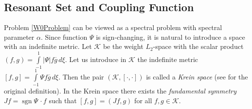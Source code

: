 \documentclass[11pt,english]{amsart}
\begin{document}
\subsection{Resonant Set and Coupling Function}
Problem \eqref{W0Problem} can be viewed as a spectral problem with  spectral parameter $\alpha$.
Since function $\Psi$ is sign-changing, it is natural to introduce a space with an indefinite metric.
Let $\mathcal{K}$ be the weight $L_2$-space with the scalar product
$(f,g)=\int\limits_{-1}^1{\left\vert{\Psi}\right\vert}f\overline{g}\,d\xi$.
Let us introduce in $\mathcal{K}$ the indefinite metric $[f,g]=\int\limits_{-1}^1\Psi f \overline{g}\,d\xi$.
Then the pair $(\mathcal{K},[\cdot,\cdot])$  is called a \emph{Krein space}
(see \cite{IA} for the original definition). In the Krein space there exists the \emph{fundamental symmetry}
$Jf=\operatorname{sgn}\Psi\, \cdot f$ such that $[f,g]=(Jf,g)$ for all $f,g\in \mathcal{K}$.
\end{document}
